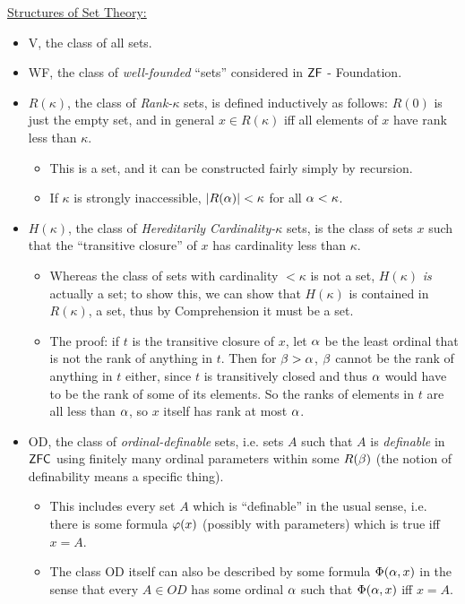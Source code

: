 \documentclass{amsart}
\DeclareMathOperator{\ZFC}{\sf{ZFC}}
\DeclareMathOperator{\ZF}{\sf{ZF}}
\begin{document}
	\underline{Structures of Set Theory:}
	\begin{itemize}
	\item V, the class of all sets.
	\item WF, the class of \textit{well-founded} ``sets'' considered in $\ZF$ - Foundation.
	\item $R(\kappa)$, the class of \textit{Rank-$\kappa$} sets, is defined inductively as follows: $R(0)$ is just the empty set, and in general $x\in R(\kappa)$ iff all elements of $x$ have rank less than $\kappa$.
	\begin{itemize}
		\item This is a set, and it can be constructed fairly simply by recursion.
		\item If $\kappa$ is strongly inaccessible, $|R(\alpha)|<\kappa$ for all $\alpha<\kappa$.
	\end{itemize}
	\item $H(\kappa)$, the class of \textit{Hereditarily Cardinality-$\kappa$} sets, is the class of sets $x$ such that the ``transitive closure'' of $x$ has cardinality less than $\kappa$.
	\begin{itemize}
		\item Whereas the class of sets with cardinality $<\kappa$ is not a set, $H(\kappa)$ \textit{is} actually a set; to show this, we can show that $H(\kappa)$ is contained in $R(\kappa)$, a set, thus by Comprehension it must be a set.
		\item The proof: if $t$ is the transitive closure of $x$, let $\alpha$ be the least ordinal that is not the rank of anything in $t$. Then for $\beta>\alpha$, $\beta$ cannot be the rank of anything in $t$ either, since $t$ is transitively closed and thus $\alpha$ would have to be the rank of some of its elements. So the ranks of elements in $t$ are all less than $\alpha$, so $x$ itself has rank at most $\alpha$. 
	\end{itemize}
	\item OD, the class of \textit{ordinal-definable} sets, i.e. sets $A$ such that $A$ is \textit{definable} in $\ZFC$ using finitely many ordinal parameters within some $R(\beta)$ (the notion of definability means a specific thing). 
	\begin{itemize}
		\item This includes every set $A$ which is ``definable'' in the usual sense, i.e. there is some formula $\varphi(x)$ (possibly with parameters) which is true iff $x=A$.
		\item The class OD itself can also be described by some formula $\Phi(\alpha,x)$ in the sense that every $A\in OD$ has some ordinal $\alpha$ such that $\Phi(\alpha,x)$ iff $x=A$.

\end{itemize}
\end{itemize}
\end{document}
